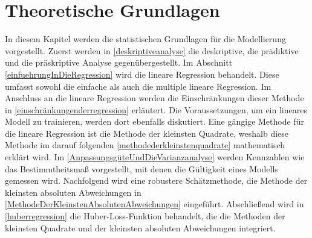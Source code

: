 \newpage
\section{Theoretische Grundlagen}
\label{TheoretischeGrundlagen}
In diesem Kapitel werden die statistischen Grundlagen für die Modellierung vorgestellt. Zuerst werden in \autoref{deskriptiveanalyse} die deskriptive, die prädiktive und die präskriptive Analyse gegenübergestellt. Im Abschnitt \autoref{einfuehrungInDieRegression} wird die lineare Regression behandelt. Diese umfasst sowohl die einfache als auch die multiple lineare Regression. Im Anschluss an die lineare Regression werden die Einschränkungen dieser Methode in \autoref{einschränkungenderregression} erläutert. Die Voraussetzungen, um ein lineares Modell zu trainieren, werden dort ebenfalls diskutiert. Eine gängige Methode für die lineare Regression ist die Methode der kleinsten Quadrate, weshalb diese Methode im darauf folgenden \autoref{methodederkleinstenquadrate} mathematisch erklärt wird. Im \autoref{AnpassungsgüteUndDieVarianzanalyse} werden Kennzahlen wie das Bestimmtheitsmaß vorgestellt, mit denen die Gültigkeit eines Modells gemessen wird.
Nachfolgend wird eine robustere Schätzmethode, die Methode der kleinsten absoluten Abweichungen in \autoref{MethodeDerKleinstenAbsolutenAbweichungen} eingeführt. Abschließend wird in \autoref{huberregression} die Huber-Loss-Funktion behandelt, die die Methoden der kleinsten Quadrate und der kleinsten absoluten Abweichungen integriert.
